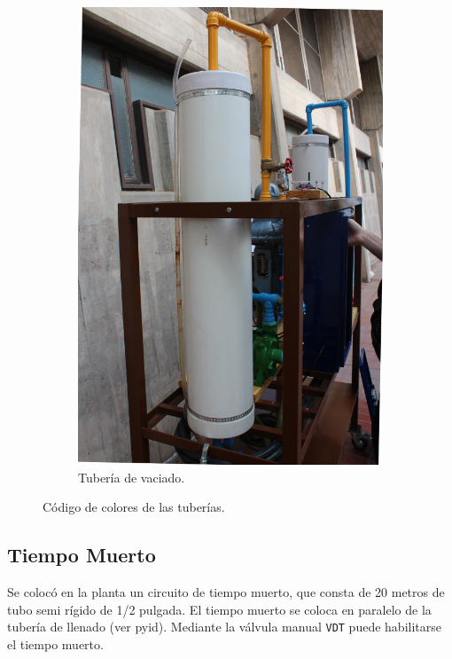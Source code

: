 \begin{figure}[t]
\begin{subfigure}[b]{0.40\textwidth}
\includegraphics[width=\textwidth]{Cap2-DisenoEnsamblado/images/caneria2.JPG}
	\caption{Tubería de vaciado.}
        \end{subfigure}
        \caption{Código de colores de las tuberías.}
        \label{fig:canerias}
\end{figure}

\subsection{Tiempo Muerto}
\label{subsec:tiempoMuerto}
Se colocó en la planta un circuito de tiempo muerto, que consta de 20 metros de
tubo semi rígido de 1/2 pulgada.
El tiempo muerto se coloca en paralelo de la tubería de llenado (ver
\gls{pyid}).
Mediante la válvula manual \verb|VDT| puede habilitarse el tiempo muerto.

